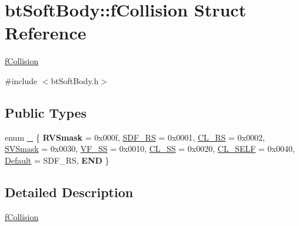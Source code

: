 \hypertarget{structbtSoftBody_1_1fCollision}{}\section{bt\+Soft\+Body\+:\+:f\+Collision Struct Reference}
\label{structbtSoftBody_1_1fCollision}


\hyperlink{structbtSoftBody_1_1fCollision}{f\+Collision}  




{\ttfamily \#include $<$bt\+Soft\+Body.\+h$>$}

\subsection*{Public Types}
\begin{DoxyCompactItemize}
\item 
enum \hyperlink{structbtSoftBody_1_1fCollision_afeb40bef0380b8db7e9e5628cc5f08d5}{\+\_\+} \{ \newline
{\bfseries R\+V\+Smask} = 0x000f, 
\hyperlink{structbtSoftBody_1_1fCollision_afeb40bef0380b8db7e9e5628cc5f08d5a7c057a9cdfcd280d9ec3bf69e09edc62}{S\+D\+F\+\_\+\+RS} = 0x0001, 
\hyperlink{structbtSoftBody_1_1fCollision_afeb40bef0380b8db7e9e5628cc5f08d5af9bbf62b0d36af93b1198eb19d800813}{C\+L\+\_\+\+RS} = 0x0002, 
\hyperlink{structbtSoftBody_1_1fCollision_afeb40bef0380b8db7e9e5628cc5f08d5a720d2ba3f15fb6ca5c417c5971eb05b6}{S\+V\+Smask} = 0x0030, 
\newline
\hyperlink{structbtSoftBody_1_1fCollision_afeb40bef0380b8db7e9e5628cc5f08d5a1ad696f1fa631c1256c18a3c8eb18ebc}{V\+F\+\_\+\+SS} = 0x0010, 
\hyperlink{structbtSoftBody_1_1fCollision_afeb40bef0380b8db7e9e5628cc5f08d5a602caf1ca49fea4d9215dbea6ad17f04}{C\+L\+\_\+\+SS} = 0x0020, 
\hyperlink{structbtSoftBody_1_1fCollision_afeb40bef0380b8db7e9e5628cc5f08d5a71505ee64a4a976707c73ec67cfcd533}{C\+L\+\_\+\+S\+E\+LF} = 0x0040, 
\hyperlink{structbtSoftBody_1_1fCollision_afeb40bef0380b8db7e9e5628cc5f08d5a1c6fb7a4f36642982c053815889133e5}{Default} = S\+D\+F\+\_\+\+RS, 
\newline
{\bfseries E\+ND}
 \}
\end{DoxyCompactItemize}


\subsection{Detailed Description}
\hyperlink{structbtSoftBody_1_1fCollision}{f\+Collision} 


